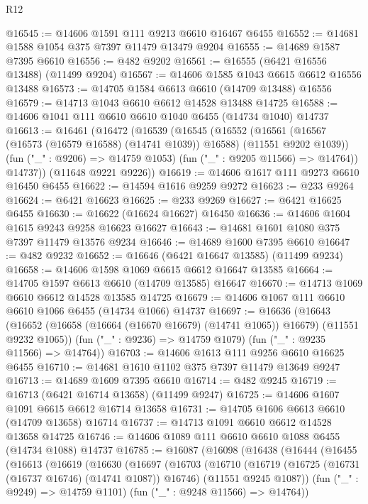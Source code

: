 \begin{lexlean}{R12}
\begin{coremodule}
@16545 := @14606 @1591 @111 @9213 @6610 @16467 @6455
@16552 := @14681 @1588 @1054 @375 @7397 @11479 @13479 @9204
@16555 := @14689 @1587 @7395 @6610
@16556 := @482 @9202
@16561 := @16555 (@6421 @16556 @13488) (@11499 @9204)
@16567 := @14606 @1585 @1043 @6615 @6612 @16556 @13488
@16573 := @14705 @1584 @6613 @6610 (@14709 @13488) @16556
@16579 := @14713 @1043 @6610 @6612 @14528 @13488 @14725
@16588 := @14606 @1041 @111 @6610 @6610 @1040 @6455 (@14734 @1040) @14737
@16613 := @16461
    (@16472
      (@16539
        (@16545
          (@16552
            (@16561 (@16567 (@16573 (@16579 @16588) (@14741 @1039)) @16588) (@11551 @9202 @1039))
            (fun ("_" : @9206) => @14759 @1053)
            (fun ("_" : @9205 @11566) => @14764))
          @14737))
      (@11648 @9221 @9226))
@16619 := @14606 @1617 @111 @9273 @6610 @16450 @6455
@16622 := @14594 @1616 @9259 @9272
@16623 := @233 @9264
@16624 := @6421 @16623
@16625 := @233 @9269
@16627 := @6421 @16625 @6455
@16630 := @16622 (@16624 @16627) @16450
@16636 := @14606 @1604 @1615 @9243 @9258 @16623 @16627
@16643 := @14681 @1601 @1080 @375 @7397 @11479 @13576 @9234
@16646 := @14689 @1600 @7395 @6610
@16647 := @482 @9232
@16652 := @16646 (@6421 @16647 @13585) (@11499 @9234)
@16658 := @14606 @1598 @1069 @6615 @6612 @16647 @13585
@16664 := @14705 @1597 @6613 @6610 (@14709 @13585) @16647
@16670 := @14713 @1069 @6610 @6612 @14528 @13585 @14725
@16679 := @14606 @1067 @111 @6610 @6610 @1066 @6455 (@14734 @1066) @14737
@16697 := @16636
    (@16643
      (@16652 (@16658 (@16664 (@16670 @16679) (@14741 @1065)) @16679) (@11551 @9232 @1065))
      (fun ("_" : @9236) => @14759 @1079)
      (fun ("_" : @9235 @11566) => @14764))
@16703 := @14606 @1613 @111 @9256 @6610 @16625 @6455
@16710 := @14681 @1610 @1102 @375 @7397 @11479 @13649 @9247
@16713 := @14689 @1609 @7395 @6610
@16714 := @482 @9245
@16719 := @16713 (@6421 @16714 @13658) (@11499 @9247)
@16725 := @14606 @1607 @1091 @6615 @6612 @16714 @13658
@16731 := @14705 @1606 @6613 @6610 (@14709 @13658) @16714
@16737 := @14713 @1091 @6610 @6612 @14528 @13658 @14725
@16746 := @14606 @1089 @111 @6610 @6610 @1088 @6455 (@14734 @1088) @14737
@16785 := @16087
    (@16098
      (@16438
        (@16444
          (@16455
            (@16613
              (@16619
                (@16630
                  (@16697
                    (@16703
                      (@16710
                        (@16719
                          (@16725 (@16731 (@16737 @16746) (@14741 @1087)) @16746)
                          (@11551 @9245 @1087))
                        (fun ("_" : @9249) => @14759 @1101)
                        (fun ("_" : @9248 @11566) => @14764))

\end{coremodule}
\end{lexlean}

